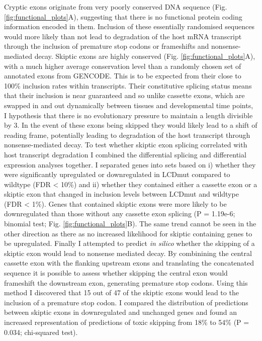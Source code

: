 Cryptic exons originate from very poorly conserved DNA sequence  (Fig. \ref{fig:functional_plots}A), suggesting that there is no functional protein coding information encoded in them. 
Inclusion of these essentially randomised sequences would more likely than not lead to degradation of the host mRNA transcript through the inclusion of premature stop codons or frameshifts and nonsense-mediated decay.
Skiptic exons are highly conserved (Fig. \ref{fig:functional_plots}A), with a much higher average conservation level than a randomly chosen set of annotated exons from GENCODE.  
This is to be expected from their close to 100\% inclusion rates within transcripts. 
Their constitutive splicing status means that their inclusion is near guaranteed and so unlike cassette exons, which are swapped in and out dynamically between tissues and developmental time points, I hypothesis that there is no evolutionary pressure to maintain a length divisible by 3. 
In the event of these exons being skipped they would likely lead to a shift of reading frame, potentially leading to degradation of the host transcript through nonsense-mediated decay.
 To test whether skiptic exon splicing correlated with host transcript degradation I combined the differential splicing and differential expression analyses together. I separated genes into sets based on i) whether they were significantly upregulated or downregulated in LCDmut compared to wildtype (FDR < 10\%) and ii) whether they contained either a cassette exon or a skiptic exon that changed in inclusion levels between LCDmut and wildtype (FDR < 1\%). 
 Genes that contained skiptic exons were more likely to be downregulated than those without any cassette exon splicing  (P = 1.19e-6; binomial test; Fig. \ref{fig:functional_plots}B). The same trend cannot be seen in the other direction as there as no increased likelihood for skiptic containing genes to be upregulated. 
 Finally I attempted to predict \textit{in silico} whether the skipping of a skiptic exon would lead to nonsense mediated decay. 
 By combinining the central cassette exon with the flanking upstream exons and translating the concatenated sequence it is possible to assess whether skipping the central exon would frameshift the downstream exon, generating premature stop codons. 
 Using this method I discovered that 15 out of 47 of the skiptic exons would lead to the inclusion of a premature stop codon.  
I compared the distribution of predictions between skiptic exons in downregulated and unchanged genes and found an increased representation of predictions of toxic skipping from 18\% to 54\% (P = 0.034; chi-squared test). 

